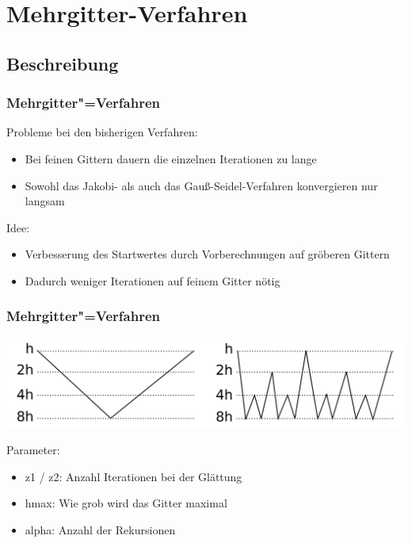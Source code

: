 \documentclass{beamer}
\begin{document}
\section{Mehrgitter-Verfahren}
\subsection{Beschreibung}
\begin{frame}
    \frametitle{Mehrgitter"=Verfahren}
    Probleme bei den bisherigen Verfahren:
    \begin{itemize}
        \item Bei feinen Gittern dauern die einzelnen Iterationen zu lange
        \item Sowohl das Jakobi- als auch das Gauß-Seidel-Verfahren konvergieren nur langsam
    \end{itemize}
    Idee:
    \begin{itemize}
        \item Verbesserung des Startwertes durch Vorberechnungen auf gröberen Gittern
        \item Dadurch weniger Iterationen auf feinem Gitter nötig
    \end{itemize}
\end{frame}

\begin{frame}
    \frametitle{Mehrgitter"=Verfahren}
    \includegraphics[width=\textwidth]{valgorithmus}

    Parameter:
    \begin{itemize}
        \item z1 / z2: Anzahl Iterationen bei der Glättung
        \item hmax: Wie grob wird das Gitter maximal
        \item alpha: Anzahl der Rekursionen
    \end{itemize}
\end{frame}
\end{document}
